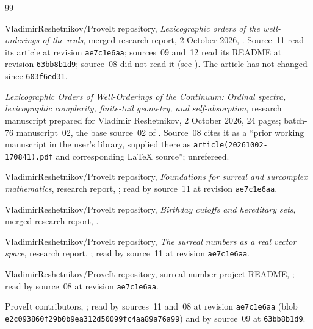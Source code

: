 \documentclass[11pt]{article}
\theoremstyle{definition}
\theoremstyle{remark}
\begin{document}
\begin{thebibliography}{99}
\small

VladimirReshetnikov/ProveIt repository,
\emph{Lexicographic orders of the well-orderings of the reals},
merged research report, 2 October 2026,
.
Source~11 read its article at revision \texttt{ae7c1e6aa}; sources~09 and~12
read its README at revision \texttt{63bb8b1d9}; source~08 did not read it
(see \cite{Batch76Source02}). The article has not changed since
\texttt{603f6ed31}.

\emph{Lexicographic Orders of Well-Orderings of the Continuum: Ordinal
spectra, lexicographic complexity, finite-tail geometry, and self-absorption},
research manuscript prepared for Vladimir Reshetnikov, 2 October 2026,
24 pages; batch-76 manuscript~02, the base source~02 of \cite{ProveItReals}.
Source~08 cites it as a ``prior working manuscript in the user's library,
supplied there as \texttt{article(20261002-170841).pdf} and corresponding
\LaTeX{} source''; unrefereed.

VladimirReshetnikov/ProveIt repository,
\emph{Foundations for surreal and surcomplex mathematics}, research report,
;
read by source~11 at revision \texttt{ae7c1e6aa}.

VladimirReshetnikov/ProveIt repository,
\emph{Birthday cutoffs and hereditary sets}, merged research report,
.

VladimirReshetnikov/ProveIt repository,
\emph{The surreal numbers as a real vector space},
research report,
;
read by source~11 at revision \texttt{ae7c1e6aa}.

VladimirReshetnikov/ProveIt repository, surreal-number project README,
; read by source~08 at revision
\texttt{ae7c1e6aa}.

ProveIt contributors, ;
read by sources~11 and~08 at revision \texttt{ae7c1e6aa} (blob
\texttt{e2c093860f29b0b9ea312d50099fc4aa89a76a99}) and by source~09 at
\texttt{63bb8b1d9}.


\end{thebibliography}
\end{document}
